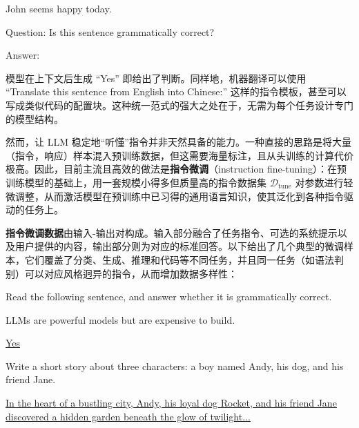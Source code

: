 \vspace{0.5em}
\begin{tcolorbox}
\hspace{4em} John seems happy today.

\hspace{4em} Question: Is this sentence grammatically correct?

\hspace{4em} Answer: \underline{\hspace{2em}}
\end{tcolorbox}
\vspace{0.5em}

模型在上下文后生成 ``Yes'' 即给出了判断。同样地，机器翻译可以使用 ``Translate this sentence from English into Chinese:'' 这样的指令模板，甚至可以写成类似代码的配置块。这种统一范式的强大之处在于，无需为每个任务设计专门的模型结构。

然而，让 LLM 稳定地“听懂”指令并非天然具备的能力。一种直接的思路是将大量（指令，响应）样本混入预训练数据，但这需要海量标注，且从头训练的计算代价极高。因此，目前主流且高效的做法是\textbf{指令微调}（instruction fine-tuning）：在预训练模型的基础上，用一套规模小得多但质量高的指令数据集 $\mathcal{D}_{\text{tune}}$ 对参数进行轻微调整，从而激活模型在预训练中已习得的通用语言知识，使其泛化到各种指令驱动的任务上。

\textbf{指令微调数据}由输入-输出对构成。输入部分融合了任务指令、可选的系统提示以及用户提供的内容，输出部分则为对应的标准回答。以下给出了几个典型的微调样本，它们覆盖了分类、生成、推理和代码等不同任务，并且同一任务（如语法判别）可以对应风格迥异的指令，从而增加数据多样性：

\vspace{0.5em}
\begin{tcolorbox}
\begin{center}
\parbox{0.9\textwidth}{
{\color{blue} Read the following sentence, and answer whether it is grammatically correct.}

{\color{blue} LLMs are powerful models but are expensive to build.}

\vspace{0.3em}
\underline{Yes}
}
\end{center}
\end{tcolorbox}

\vspace{0.5em}
\begin{tcolorbox}
\begin{center}
\parbox{0.9\textwidth}{
{\color{blue} Write a short story about three characters: a boy named Andy, his dog, and his friend Jane.}

\vspace{0.3em}
\uline{In the heart of a bustling city, Andy, his loyal dog Rocket, and his friend Jane discovered a hidden garden beneath the glow of twilight...}
}
\end{center}
\end{tcolorbox}


